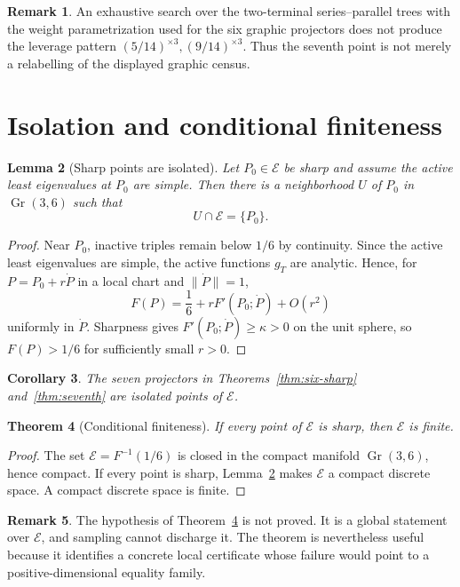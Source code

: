 \documentclass[11pt]{article}
\numberwithin{equation}{section}
\newtheorem{theorem}{Theorem}[section]
\newtheorem{lemma}[theorem]{Lemma}
\newtheorem{corollary}[theorem]{Corollary}
\theoremstyle{definition}
\newtheorem{remark}[theorem]{Remark}
\newcommand{\Gr}{\operatorname{Gr}}
\newcommand{\cE}{\mathcal E}
\begin{document}
\begin{remark}
An exhaustive search over the two-terminal series--parallel trees with the
weight parametrization used for the six graphic projectors does not produce the
leverage pattern $(5/14)^{\times3},(9/14)^{\times3}$.  Thus the seventh point is
not merely a relabelling of the displayed graphic census.
\end{remark}

\section{Isolation and conditional finiteness}

\begin{lemma}[Sharp points are isolated]\label{lem:sharp-isolated}
Let $P_0\in\cE$ be sharp and assume the active least eigenvalues at $P_0$ are
simple.  Then there is a neighborhood $U$ of $P_0$ in $\Gr(3,6)$ such that
\[
  U\cap\cE=\{P_0\}.
\]
\end{lemma}

\begin{proof}
Near $P_0$, inactive triples remain below $1/6$ by continuity.  Since the active
least eigenvalues are simple, the active functions $g_T$ are analytic.  Hence,
for $P=P_0+r\dot P$ in a local chart and $\|\dot P\|=1$,
\[
  F(P)=\frac16+rF'(P_0;\dot P)+O(r^2)
\]
uniformly in $\dot P$.  Sharpness gives $F'(P_0;\dot P)\ge\kappa>0$ on the unit
sphere, so $F(P)>1/6$ for sufficiently small $r>0$.
\end{proof}

\begin{corollary}
The seven projectors in Theorems~\ref{thm:six-sharp} and~\ref{thm:seventh} are
isolated points of $\cE$.
\end{corollary}

\begin{theorem}[Conditional finiteness]\label{thm:conditional-finite}
If every point of $\cE$ is sharp, then $\cE$ is finite.
\end{theorem}

\begin{proof}
The set $\cE=F^{-1}(1/6)$ is closed in the compact manifold $\Gr(3,6)$, hence
compact.  If every point is sharp, Lemma~\ref{lem:sharp-isolated} makes $\cE$ a
compact discrete space.  A compact discrete space is finite.
\end{proof}

\begin{remark}
The hypothesis of Theorem~\ref{thm:conditional-finite} is not proved.  It is a
global statement over $\cE$, and sampling cannot discharge it.  The theorem is
nevertheless useful because it identifies a concrete local certificate whose
failure would point to a positive-dimensional equality family.
\end{remark}
\end{document}
